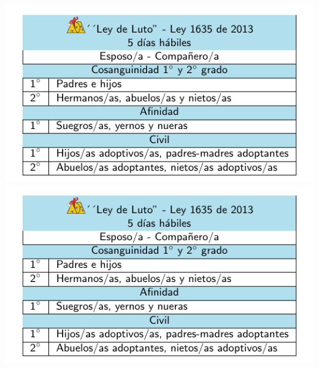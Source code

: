 \documentclass[10pt,letterpaper]{minimal}
\begin{document}
\begin{center}
\hspace{.5mm}\includegraphics[scale=1]{Tarjeta2.pdf} \includegraphics[scale=1]{Tarjeta2.pdf} \vspace{1.1mm}


\end{center}
\end{document}
